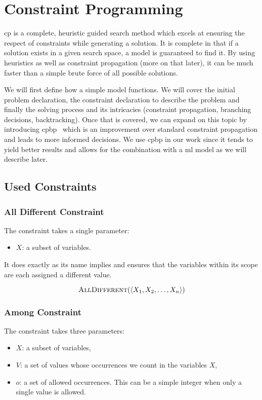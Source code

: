 \documentclass[../Document.tex]{subfiles}
\begin{document}
\section{Constraint Programming}
\label{sec:intro/cp}
\acrlong{cp} is a complete, heuristic guided search method which excels at ensuring the respect of constraints while generating a solution. It is complete in that if a solution exists in a given search space, a \cp model is guaranteed to find it. By using heuristics as well as constraint propagation (more on that later), it can be much faster than a simple brute force of all possible solutions.

We will first define how a simple \cp model functions. We will cover the initial problem declaration, the constraint declaration to describe the problem and finally the solving process and its intricacies (constraint propagation, branching decisions, backtracking).
Once that is covered, we can expand on this topic by introducing \gls{cpbp}~\cite{GP:BP}
which is an improvement over standard constraint propagation and leads to more informed decisions. We use \gls{cpbp} in our work since it tends to yield better results and allows for the combination with a \gls{ml} model as we will describe later.

\subsection{Used Constraints}

\subsubsection{All Different Constraint}
The \alldifferent constraint takes a single parameter:
\begin{itemize}
    \item $X$: a subset of variables.
\end{itemize}

It does exactly as its name implies and ensures that the variables within its scope are each assigned a different value.

$$
    \mbox{\sc AllDifferent}(\langle X_1, X_2, \ldots, X_n \rangle)
$$

\subsubsection{Among Constraint}
The \among constraint takes three parameters: 
\begin{itemize}
    \item $X$: a subset of variables,
    \item $V$: a set of values whose occurrences we count in the variables $X$,
    \item $o$: a set of allowed occurrences. This can be a simple integer when only a single value is allowed.
\end{itemize}
\end{document}
